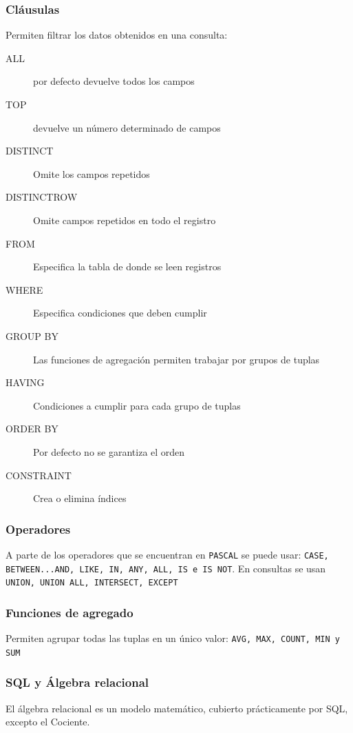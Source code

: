     \subsubsection{Cláusulas}
        Permiten filtrar los datos obtenidos en una consulta:
        \begin{description}
            \item[ALL] por defecto devuelve todos los campos
            \item[TOP] devuelve un número determinado de campos
            \item[DISTINCT] Omite los campos repetidos
            \item[DISTINCTROW] Omite campos repetidos en todo el registro
            \item[FROM] Especifica la tabla de donde se leen registros
            \item[WHERE] Especifica condiciones que deben cumplir
            \item[GROUP BY] Las funciones de agregación permiten trabajar por grupos de tuplas
            \item[HAVING] Condiciones a cumplir para cada grupo de tuplas
            \item[ORDER BY] Por defecto no se garantiza el orden
            \item[CONSTRAINT] Crea o elimina índices
        \end{description}

    \subsubsection{Operadores}
        A parte de los operadores que se encuentran en \texttt{PASCAL} se puede usar: \texttt{CASE, BETWEEN...AND, LIKE, IN, ANY, ALL, IS e IS NOT}. En consultas se usan   \texttt{UNION, UNION ALL, INTERSECT, EXCEPT}
    \subsubsection{Funciones de agregado}
        Permiten agrupar todas las tuplas en un único valor: \texttt{AVG, MAX, COUNT, MIN y SUM}

    \subsubsection{SQL y Álgebra relacional}
        El álgebra relacional es un modelo matemático, cubierto prácticamente por SQL, excepto el Cociente.


